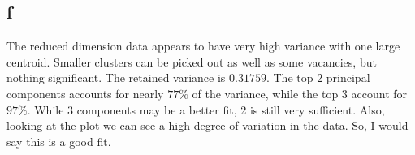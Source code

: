 \documentclass{article}
\begin{document}
\subsection{f}
The reduced dimension data appears to have very high variance with one large centroid.
Smaller clusters can be picked out as well as some vacancies, but nothing significant.
The retained variance is $0.31759$. The top 2 principal components accounts for nearly $77\%$ of
the variance, while the top 3 account for $97\%$. While 3 components may be a better fit, 2 is still
very sufficient. Also, looking at the plot we can see a high degree of variation in the data. So, I would
say this is a good fit.
\end{document}
